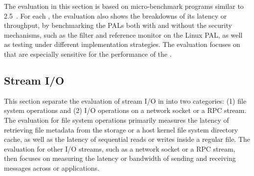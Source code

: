 The evaluation in this section is based on micro-benchmark programs similar to \lmbench{} 2.5~\cite{McVoy:lmbench}.
For each \hostapis{}, the evaluation also shows the breakdowns
of its latency or throughput,
by benchmarking the PALs both with and without the security mechanisms, such as the \seccomp{} filter and reference monitor on the Linux PAL,
as well as testing under different
implementation strategies.
The evaluation focuses on \hostapis{} that are especially sensitive for the performance of the \graphene{} \libos{}.





\subsection{Stream I/O}
\label{sec:eval:pal:stream}

This section separate the evaluation of stream I/O in \thehostabi{} into 
two categories:
(1) file system operations and (2) I/O operations on a network socket or a RPC stream.
The evaluation for file system operations
primarily measures
the latency of retrieving file metadata from the storage or a host kernel file system directory cache,
as well as the latency of sequential reads or writes
inside a regular file.
The evaluation for other I/O streams, such as a network socket or a RPC stream,
then focuses on measuring the latency or bandwidth
of sending and receiving messages 
across \picoprocs{} or applications.







